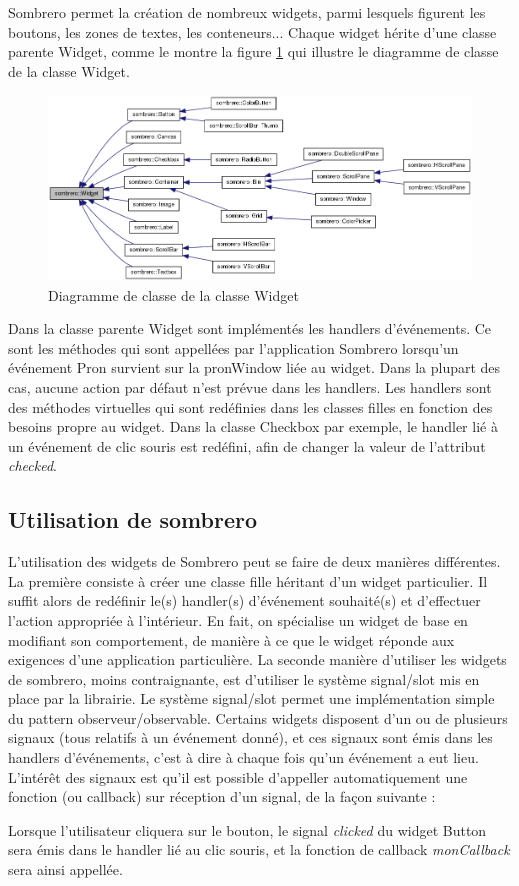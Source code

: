 Sombrero permet la création de nombreux widgets, parmi lesquels figurent les boutons, les zones de textes, les conteneurs...
Chaque widget hérite d'une classe parente Widget, comme le montre la figure \ref{fig:classDiagWidget} qui illustre le diagramme de classe de la classe Widget.

\begin{figure}[H]
  \centering
  \includegraphics[width=17cm]{images/classDiagWidget.png}
  \caption{Diagramme de classe de la classe Widget}
  \label{fig:classDiagWidget}
\end{figure}

Dans la classe parente Widget sont implémentés les handlers d'événements.
Ce sont les méthodes qui sont appellées par l'application Sombrero lorsqu'un événement Pron survient sur la pronWindow liée au widget.
Dans la plupart des cas, aucune action par défaut n'est prévue dans les handlers.
Les handlers sont des méthodes virtuelles qui sont redéfinies dans les classes filles en fonction des besoins propre au widget.
Dans la classe Checkbox par exemple, le handler lié à un événement de clic souris est redéfini, afin de changer la valeur de l'attribut \textit{checked}.

\subsection{Utilisation de sombrero}

L'utilisation des widgets de Sombrero peut se faire de deux manières différentes. 
La première consiste à créer une classe fille héritant d'un widget particulier.
Il suffit alors de redéfinir le(s) handler(s) d'événement souhaité(s) et d'effectuer l'action appropriée à l'intérieur.
En fait, on spécialise un widget de base en modifiant son comportement, de manière à ce que le widget réponde aux exigences d'une application particulière.
La seconde manière d'utiliser les widgets de sombrero, moins contraignante, est d'utiliser le système signal/slot mis en place par la librairie.
Le système signal/slot permet une implémentation simple du pattern observeur/observable.
Certains widgets disposent d'un ou de plusieurs signaux (tous relatifs à un événement donné), et ces signaux sont émis dans les handlers d'événements, c'est à dire à chaque fois qu'un événement a eut lieu.
L'intérêt des signaux est qu'il est possible d'appeller automatiquement une fonction (ou callback) sur réception d'un signal, de la façon suivante :



Lorsque l'utilisateur cliquera sur le bouton, le signal \textit{clicked} du widget Button sera émis dans le handler lié au clic souris, et la fonction de callback \textit{monCallback} sera ainsi appellée.
